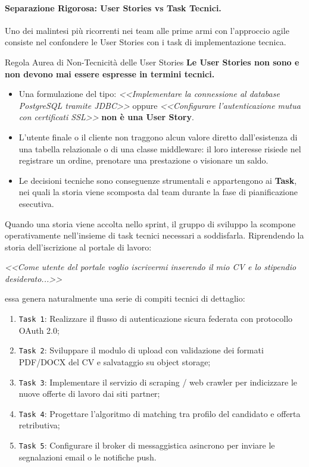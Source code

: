 \documentclass[12pt]{extarticle}
\begin{document}
\paragraph{Separazione Rigorosa: User Stories vs Task Tecnici.}
Uno dei malintesi più ricorrenti nei team alle prime armi con l'approccio agile consiste nel confondere le User Stories con i task di implementazione tecnica.

\begin{cbox}{Regola Aurea di Non-Tecnicità delle User Stories}
\noindent \textbf{Le User Stories non sono e non devono mai essere espresse in termini tecnici.}
\begin{itemize}
    \item Una formulazione del tipo: \textit{<<Implementare la connessione al database PostgreSQL tramite JDBC>>} oppure \textit{<<Configurare l'autenticazione mutua con certificati SSL>>} \textbf{non è una User Story}.
    \item L'utente finale o il cliente non traggono alcun valore diretto dall'esistenza di una tabella relazionale o di una classe middleware: il loro interesse risiede nel registrare un ordine, prenotare una prestazione o visionare un saldo.
    \item Le decisioni tecniche sono conseguenze strumentali e appartengono ai \textbf{Task}, nei quali la storia viene scomposta dal team durante la fase di pianificazione esecutiva.
\end{itemize}
\end{cbox}

\noindent Quando una storia viene accolta nello sprint, il gruppo di sviluppo la scompone operativamente nell'insieme di task tecnici necessari a soddisfarla. Riprendendo la storia dell'iscrizione al portale di lavoro:
\begin{center}
\textit{<<Come utente del portale voglio iscrivermi inserendo il mio CV e lo stipendio desiderato...>>}
\end{center}
essa genera naturalmente una serie di compiti tecnici di dettaglio:
\begin{enumerate}
    \item \texttt{Task 1}: Realizzare il flusso di autenticazione sicura federata con protocollo OAuth 2.0;
    \item \texttt{Task 2}: Sviluppare il modulo di upload con validazione dei formati PDF/DOCX del CV e salvataggio su object storage;
    \item \texttt{Task 3}: Implementare il servizio di scraping / web crawler per indicizzare le nuove offerte di lavoro dai siti partner;
    \item \texttt{Task 4}: Progettare l'algoritmo di matching tra profilo del candidato e offerta retributiva;
    \item \texttt{Task 5}: Configurare il broker di messaggistica asincrono per inviare le segnalazioni email o le notifiche push.
\end{enumerate}
\end{document}
